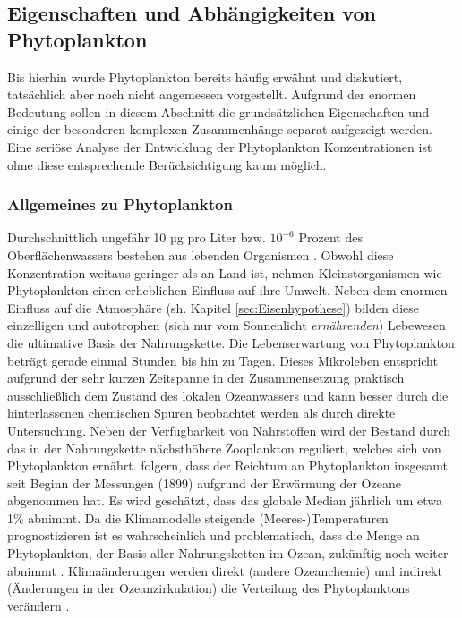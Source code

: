 \documentclass[12pt,a4paper,onecolumn,draft]{scrartcl}
\begin{document}
\subsection{Eigenschaften und Abhängigkeiten von Phytoplankton} \label{sec:Phytoplankton}
Bis hierhin wurde Phytoplankton bereits häufig erwähnt und diskutiert, tatsächlich aber noch nicht angemessen vorgestellt. Aufgrund der enormen Bedeutung sollen in diesem Abschnitt die grundsätzlichen Eigenschaften und einige der besonderen komplexen Zusammenhänge separat aufgezeigt werden. Eine seriöse Analyse der Entwicklung der Phytoplankton Konzentrationen ist ohne diese entsprechende Berücksichtigung kaum möglich. 
\subsubsection{Allgemeines zu Phytoplankton} \label{sec:Phytobasics}
Durchschnittlich ungefähr 10 µg pro Liter bzw. $10^{-6}$ Prozent des Oberflächenwassers bestehen aus lebenden Organismen \citep{Emerson.2009}. Obwohl diese Konzentration weitaus geringer als an Land ist, nehmen Kleinstorganismen wie Phytoplankton einen erheblichen Einfluss auf ihre Umwelt. Neben dem enormen Einfluss auf die Atmosphäre (sh. Kapitel \ref{sec:Eisenhypothese}) bilden diese einzelligen und autotrophen (sich nur vom Sonnenlicht \textit{ernährenden}) Lebewesen die ultimative Basis der Nahrungskette. Die Lebenserwartung von Phytoplankton beträgt gerade einmal Stunden bis hin zu Tagen. Dieses Mikroleben entspricht aufgrund der sehr kurzen Zeitspanne in der Zusammensetzung praktisch ausschließlich dem Zustand des lokalen Ozeanwassers und kann besser durch die hinterlassenen chemischen Spuren beobachtet werden als durch direkte Untersuchung. Neben der Verfügbarkeit von Nährstoffen wird der Bestand durch das in der Nahrungskette nächsthöhere Zooplankton reguliert, welches sich von Phytoplankton ernährt. \citet{Boyce.2010} folgern, dass der Reichtum an Phytoplankton insgesamt seit Beginn der Messungen (1899) aufgrund der Erwärmung der Ozeane abgenommen hat. Es wird geschätzt, dass das globale Median jährlich um etwa 1\% abnimmt. Da die Klimamodelle steigende (Meeres-)Temperaturen prognostizieren ist es wahrscheinlich und problematisch, dass die Menge an Phytoplankton, der Basis aller Nahrungsketten im Ozean, zukünftig noch weiter abnimmt \citep{Siegel.2010}. Klimaänderungen werden direkt (andere Ozeanchemie) und indirekt (Änderungen in der Ozeanzirkulation) die Verteilung des Phytoplanktons verändern \citep{Falkowski.1998}.  
\end{document}
